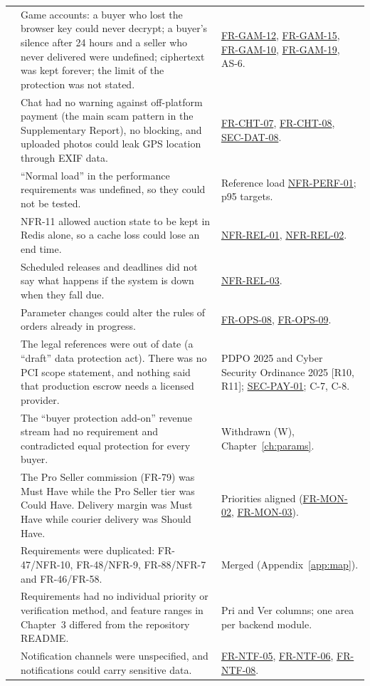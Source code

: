 \documentclass[11pt,a4paper]{report}
\newcommand{\rr}[1]{\hyperlink{#1}{#1}}
\begin{document}
{\begin{longtable}{@{}>{\raggedleft\arraybackslash}p{0.5cm} >{\raggedright\arraybackslash}p{7.3cm} >{\raggedright\arraybackslash}p{6.8cm}@{}}
20 & Game accounts: a buyer who lost the browser key could never decrypt; a buyer's silence after 24 hours and a seller who never delivered were undefined; ciphertext was kept forever; the limit of the protection was not stated. & \rr{FR-GAM-12}, \rr{FR-GAM-15}, \rr{FR-GAM-10}, \rr{FR-GAM-19}, AS-6. \\
21 & Chat had no warning against off-platform payment (the main scam pattern in the Supplementary Report), no blocking, and uploaded photos could leak GPS location through EXIF data. & \rr{FR-CHT-07}, \rr{FR-CHT-08}, \rr{SEC-DAT-08}. \\
22 & ``Normal load'' in the performance requirements was undefined, so they could not be tested. & Reference load \rr{NFR-PERF-01}; p95 targets. \\
23 & NFR-11 allowed auction state to be kept in Redis alone, so a cache loss could lose an end time. & \rr{NFR-REL-01}, \rr{NFR-REL-02}. \\
24 & Scheduled releases and deadlines did not say what happens if the system is down when they fall due. & \rr{NFR-REL-03}. \\
25 & Parameter changes could alter the rules of orders already in progress. & \rr{FR-OPS-08}, \rr{FR-OPS-09}. \\
26 & The legal references were out of date (a ``draft'' data protection act). There was no PCI scope statement, and nothing said that production escrow needs a licensed provider. & PDPO 2025 and Cyber Security Ordinance 2025 [R10, R11]; \rr{SEC-PAY-01}; C-7, C-8. \\
27 & The ``buyer protection add-on'' revenue stream had no requirement and contradicted equal protection for every buyer. & Withdrawn (W), Chapter~\ref{ch:params}. \\
28 & The Pro Seller commission (FR-79) was Must Have while the Pro Seller tier was Could Have. Delivery margin was Must Have while courier delivery was Should Have. & Priorities aligned (\rr{FR-MON-02}, \rr{FR-MON-03}). \\
29 & Requirements were duplicated: FR-47/NFR-10, FR-48/NFR-9, FR-88/NFR-7 and FR-46/FR-58. & Merged (Appendix~\ref{app:map}). \\
30 & Requirements had no individual priority or verification method, and feature ranges in Chapter~3 differed from the repository README. & Pri and Ver columns; one area per backend module. \\
31 & Notification channels were unspecified, and notifications could carry sensitive data. & \rr{FR-NTF-05}, \rr{FR-NTF-06}, \rr{FR-NTF-08}. \\

\end{longtable}}
\end{document}
